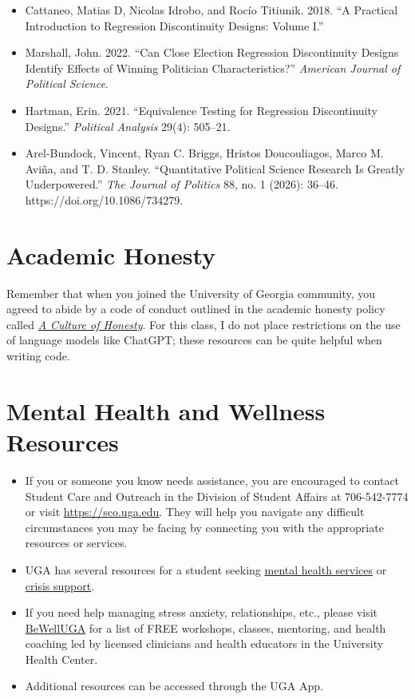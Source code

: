 \documentclass[11pt, letterpaper]{article}
\begin{document}
\begin{itemize}
	
	\item Cattaneo, Matias D, Nicolas Idrobo, and Rocío Titiunik. 2018. ``A Practical Introduction to Regression Discontinuity Designs: Volume I.''
	\item Marshall, John. 2022. ``Can Close Election Regression Discontinuity Designs Identify Effects of Winning Politician Characteristics?'' \textit{American Journal of Political Science}.
	\item Hartman, Erin. 2021. ``Equivalence Testing for Regression Discontinuity Designs.'' \textit{Political Analysis} 29(4): 505–21.
	\item Arel-Bundock, Vincent, Ryan C. Briggs, Hristos Doucouliagos, Marco M. Aviña, and T. D. Stanley. “Quantitative Political Science Research Is Greatly Underpowered.” \textit{The Journal of Politics} 88, no. 1 (2026): 36–46. https://doi.org/10.1086/734279.
\end{itemize}


\section*{Academic Honesty}

Remember that when you joined the University of Georgia community, you agreed to abide by a code of conduct outlined in the academic honesty policy called \href{https://honesty.uga.edu/Academic-Honesty-Policy/Introduction/}{\textit{A Culture of Honesty}}. For this class, I do not place restrictions on the use of language models like ChatGPT; these resources can be quite helpful when writing code. 

\section*{Mental Health and Wellness Resources}

\begin{itemize}
	\item If you or someone you know needs assistance, you are encouraged to contact Student Care and Outreach in the Division of Student Affairs at 706-542-7774 or visit \href{https://sco.uga.edu}{https://sco.uga.edu}. They will help you navigate any difficult circumstances you may be facing by connecting you with the appropriate resources or services. 
	\item UGA has several resources for a student seeking \href{https://www.uhs.uga.edu/bewelluga/bewelluga}{mental health services} or \href{https://www.uhs.uga.edu/info/emergencies}{crisis support}. 
	\item If you need help managing stress anxiety, relationships, etc., please visit \href{https://www.uhs.uga.edu/bewelluga/bewelluga}{BeWellUGA} for a list of FREE workshops, classes, mentoring, and health coaching led by licensed clinicians and health educators in the University Health Center.
	\item Additional resources can be accessed through the UGA App.
\end{itemize}


\end{document}
